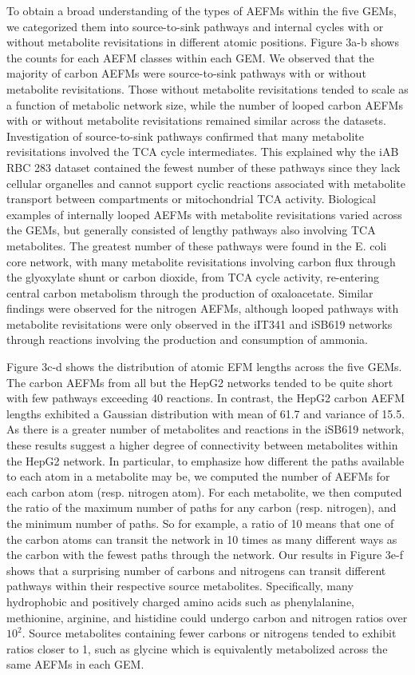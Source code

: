 \documentclass[12pt]{article}
\begin{document}
To obtain a broad understanding of the types of AEFMs within the five
GEMs, we categorized them into source-to-sink pathways and internal cycles
with or without metabolite revisitations in different atomic positions.
Figure 3a-b shows the counts for each AEFM classes within each GEM. We
observed that the majority of carbon AEFMs were source-to-sink pathways
with or without metabolite revisitations. Those without metabolite
revisitations tended to scale as a function of metabolic network size,
while the number of looped carbon AEFMs with or without metabolite
revisitations remained similar across the datasets. Investigation of
source-to-sink pathways confirmed that many metabolite revisitations
involved the TCA cycle intermediates. This explained why the iAB RBC 283
dataset contained the fewest number of these pathways since they lack
cellular organelles and cannot support cyclic reactions associated with
metabolite transport between compartments or mitochondrial TCA activity.
Biological examples of internally looped AEFMs with metabolite
revisitations varied across the GEMs, but generally consisted of lengthy
pathways also involving TCA metabolites. The greatest number of these
pathways were found in the E. coli core network, with many metabolite
revisitations involving carbon flux through the glyoxylate shunt or carbon
dioxide, from TCA cycle activity, re-entering central carbon metabolism
through the production of oxaloacetate. Similar findings were observed for
the nitrogen AEFMs, although looped pathways with metabolite revisitations
were only observed in the iIT341 and iSB619 networks through reactions
involving the production and consumption of ammonia. 

Figure 3c-d shows the distribution of atomic EFM lengths across the five
GEMs. The carbon AEFMs from all but the HepG2 networks tended to be quite
short with few pathways exceeding 40 reactions. In contrast, the HepG2
carbon AEFM lengths exhibited a Gaussian distribution with mean of 61.7
and variance of 15.5. As there is a greater number of metabolites and
reactions in the iSB619 network, these results suggest a higher degree of
connectivity between metabolites within the HepG2 network. In particular,
to emphasize how different the paths available to each atom in
a metabolite may be, we computed the number of AEFMs for each carbon atom
(resp. nitrogen atom). For each metabolite, we then computed the ratio of
the maximum number of paths for any carbon (resp. nitrogen), and the
minimum number of paths. So for example, a ratio of 10 means that one of
the carbon atoms can transit the network in 10 times as many different
ways as the carbon with the fewest paths through the network. Our results
in Figure 3e-f shows that a surprising number of carbons and nitrogens can
transit different pathways within their respective source metabolites.
Specifically, many hydrophobic and positively charged amino acids such as
phenylalanine, methionine, arginine, and histidine could undergo carbon
and nitrogen ratios over $10^2$. Source metabolites containing fewer
carbons or nitrogens tended to exhibit ratios closer to 1, such as glycine
which is equivalently metabolized across the same AEFMs in each GEM.
\end{document}
